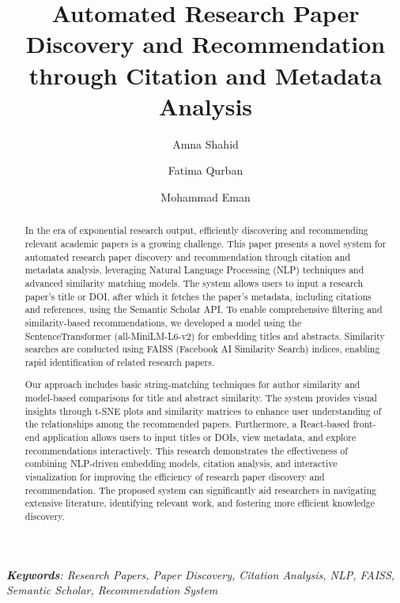 \documentclass[runningheads]{llncs}
\begin{document}
%
\title{Automated Research Paper Discovery and Recommendation through Citation and Metadata Analysis}

\author{
    Amna Shahid \and 
    Fatima Qurban \and 
    Mohammad Eman
    \newline
}


\maketitle     


\begin{abstract}
In the era of exponential research output, efficiently discovering and recommending relevant academic papers is a growing challenge. This paper presents a novel system for automated research paper discovery and recommendation through citation and metadata analysis, leveraging Natural Language Processing (NLP) techniques and advanced similarity matching models. The system allows users to input a research paper's title or DOI, after which it fetches the paper’s metadata, including citations and references, using the Semantic Scholar API. To enable comprehensive filtering and similarity-based recommendations, we developed a model using the SentenceTransformer (all-MiniLM-L6-v2) for embedding titles and abstracts. Similarity searches are conducted using FAISS (Facebook AI Similarity Search) indices, enabling rapid identification of related research papers.

Our approach includes basic string-matching techniques for author similarity and model-based comparisons for title and abstract similarity. The system provides visual insights through t-SNE plots and similarity matrices to enhance user understanding of the relationships among the recommended papers. Furthermore, a React-based front-end application allows users to input titles or DOIs, view metadata, and explore recommendations interactively. This research demonstrates the effectiveness of combining NLP-driven embedding models, citation analysis, and interactive visualization for improving the efficiency of research paper discovery and recommendation. The proposed system can significantly aid researchers in navigating extensive literature, identifying relevant work, and fostering more efficient knowledge discovery.
\newline
\end{abstract}
\textit{\textbf{Keywords}: Research Papers, Paper Discovery, Citation Analysis, NLP, FAISS, Semantic Scholar, Recommendation System}
\end{document}

